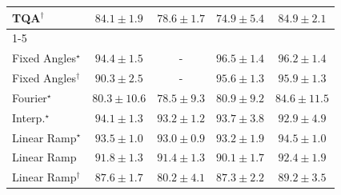 \begin{tabular}{l|cccc|}
TQA$^\dagger$ & {\cellcolor[HTML]{288A47}} \color[HTML]{F1F1F1} $84.1\pm 1.9$ & {\cellcolor[HTML]{49AF61}} \color[HTML]{F1F1F1} $78.6\pm 1.7$ & {\cellcolor[HTML]{6DC073}} \color[HTML]{000000} $74.9\pm 5.4$ & {\cellcolor[HTML]{248644}} \color[HTML]{F1F1F1} $84.9\pm 2.1$ \\
\cline{1-5}
\multicolumn{5}{c}{\rule{0pt}{8pt}SV} \\
\midrule
Fixed Angles$^\star$ & {\cellcolor[HTML]{03446A}} \color[HTML]{F1F1F1} $94.4\pm 1.5$ & {\cellcolor[HTML]{000000}} \color[HTML]{F1F1F1} {\cellcolor{white}} \color{black} - & {\cellcolor[HTML]{023858}} \color[HTML]{F1F1F1} $96.5\pm 1.4$ & {\cellcolor[HTML]{02395A}} \color[HTML]{F1F1F1} $96.2\pm 1.4$ \\
Fixed Angles$^\dagger$ & {\cellcolor[HTML]{045B8F}} \color[HTML]{F1F1F1} $90.3\pm 2.5$ & {\cellcolor[HTML]{000000}} \color[HTML]{F1F1F1} {\cellcolor{white}} \color{black} - & {\cellcolor[HTML]{023D60}} \color[HTML]{F1F1F1} $95.6\pm 1.3$ & {\cellcolor[HTML]{023B5D}} \color[HTML]{F1F1F1} $95.9\pm 1.3$ \\
Fourier$^\star$ & {\cellcolor[HTML]{2D8ABD}} \color[HTML]{F1F1F1} $80.3\pm 10.6$ & {\cellcolor[HTML]{4094C3}} \color[HTML]{F1F1F1} $78.5\pm 9.3$ & {\cellcolor[HTML]{2987BC}} \color[HTML]{F1F1F1} $80.9\pm 9.2$ & {\cellcolor[HTML]{0872B1}} \color[HTML]{F1F1F1} $84.6\pm 11.5$ \\
Interp.$^\star$ & {\cellcolor[HTML]{03466E}} \color[HTML]{F1F1F1} $94.1\pm 1.3$ & {\cellcolor[HTML]{034B76}} \color[HTML]{F1F1F1} $93.2\pm 1.2$ & {\cellcolor[HTML]{034871}} \color[HTML]{F1F1F1} $93.7\pm 3.8$ & {\cellcolor[HTML]{034D79}} \color[HTML]{F1F1F1} $92.9\pm 4.9$ \\
Linear Ramp$^\star$ & {\cellcolor[HTML]{034973}} \color[HTML]{F1F1F1} $93.5\pm 1.0$ & {\cellcolor[HTML]{034C78}} \color[HTML]{F1F1F1} $93.0\pm 0.9$ & {\cellcolor[HTML]{034B76}} \color[HTML]{F1F1F1} $93.2\pm 1.9$ & {\cellcolor[HTML]{03446A}} \color[HTML]{F1F1F1} $94.5\pm 1.0$ \\
Linear Ramp & {\cellcolor[HTML]{045483}} \color[HTML]{F1F1F1} $91.8\pm 1.3$ & {\cellcolor[HTML]{045687}} \color[HTML]{F1F1F1} $91.4\pm 1.3$ & {\cellcolor[HTML]{045C90}} \color[HTML]{F1F1F1} $90.1\pm 1.7$ & {\cellcolor[HTML]{03517E}} \color[HTML]{F1F1F1} $92.4\pm 1.9$ \\
Linear Ramp$^\dagger$ & {\cellcolor[HTML]{0566A0}} \color[HTML]{F1F1F1} $87.6\pm 1.7$ & {\cellcolor[HTML]{2F8BBE}} \color[HTML]{F1F1F1} $80.2\pm 4.1$ & {\cellcolor[HTML]{0567A2}} \color[HTML]{F1F1F1} $87.3\pm 2.2$ & {\cellcolor[HTML]{046096}} \color[HTML]{F1F1F1} $89.2\pm 3.5$ \\

\end{tabular}
